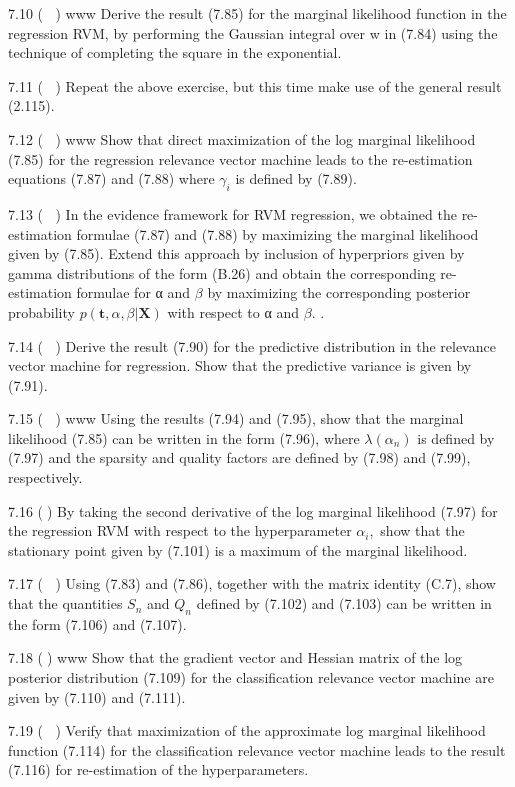 \documentclass[
  10
]{article}
\begin{document}
7.10 ( ) www Derive the result (7.85) for the marginal likelihood
function in the regression RVM, by performing the Gaussian integral over
w in (7.84) using the technique of completing the square in the
exponential.

7.11 ( ) Repeat the above exercise, but this time make use of the
general result (2.115).

7.12 ( ) www Show that direct maximization of the log marginal
likelihood (7.85) for the regression relevance vector machine leads to
the re-estimation equations (7.87) and (7.88) where \(\gamma _ { i }\)
is defined by (7.89).

7.13 ( ) In the evidence framework for RVM regression, we obtained the
re-estimation formulae (7.87) and (7.88) by maximizing the marginal
likelihood given by (7.85). Extend this approach by inclusion of
hyperpriors given by gamma distributions of the form (B.26) and obtain
the corresponding re-estimation formulae for α and \(\beta\) by
maximizing the corresponding posterior probability
\(p ( \mathbf { t } , \alpha , \beta | \mathbf { X } )\) with respect to
α and \(\beta .\) .

7.14 ( ) Derive the result (7.90) for the predictive distribution in the
relevance vector machine for regression. Show that the predictive
variance is given by (7.91).

7.15 ( ) www Using the results (7.94) and (7.95), show that the marginal
likelihood (7.85) can be written in the form (7.96), where
\(\lambda ( \alpha _ { n } )\) is defined by (7.97) and the sparsity and
quality factors are defined by (7.98) and (7.99), respectively.

7.16 () By taking the second derivative of the log marginal likelihood
(7.97) for the regression RVM with respect to the hyperparameter
\(\alpha _ { i } ,\) show that the stationary point given by (7.101) is
a maximum of the marginal likelihood.

7.17 ( ) Using (7.83) and (7.86), together with the matrix identity
(C.7), show that the quantities \(S _ { n }\) and \(Q _ { n }\) defined
by (7.102) and (7.103) can be written in the form (7.106) and (7.107).

7.18 () www Show that the gradient vector and Hessian matrix of the log
posterior distribution (7.109) for the classification relevance vector
machine are given by (7.110) and (7.111).

7.19 ( ) Verify that maximization of the approximate log marginal
likelihood function (7.114) for the classification relevance vector
machine leads to the result (7.116) for re-estimation of the
hyperparameters.
\end{document}
